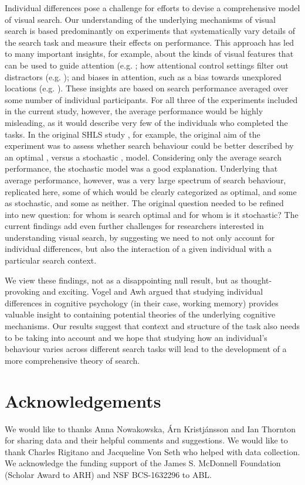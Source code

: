 \documentclass[twocolumn]{article}
\begin{document}
Individual differences pose a challenge for efforts to devise a comprehensive model of visual search. Our understanding of the underlying mechanisms of visual search is based predominantly on experiments that systematically vary details of the search task and measure their effects on performance. This approach has led to many important insights, for example, about the kinds of visual features that can be used to guide attention (e.g. \cite{treisman1980, wolfe2007}; how attentional control settings filter out distractors (e.g. \cite{folk1992,yantis1999}); and  biases in attention, such as a bias towards unexplored locations (e.g. \cite{klein2000}). These insights are based on search performance averaged over some number of individual participants. For all three of the experiments included in the current study, however, the average performance would be highly misleading, as it would describe very few of the individuals who completed the tasks. In the original SHLS study \cite{nowakowska2017}, for example, the original aim of the experiment was to assess whether search behaviour could be better described by an optimal \cite{najemnik-geisler2008}, versus a stochastic \cite{clarke2016}, model. Considering only the average search performance, the stochastic model was a good explanation. Underlying that average performance, however, was a very large spectrum of search behaviour, replicated here, some of which would be clearly categorized as optimal, and some as stochastic, and some as neither. The original question needed to be refined into new question: for whom is search optimal and for whom is it stochastic? The current findings add even further challenges for researchers interested in understanding visual search, by suggesting we need to not only account for individual differences, but also the interaction of a given individual with a particular search context. 

We view these findings, not as a disappointing null result, but as thought-provoking and exciting. Vogel and Awh\cite{vogel2008} argued that studying individual differences in cognitive psychology (in their case, working memory) provides valuable insight to containing potential theories of the underlying cognitive mechanisms. Our results suggest that context and structure of the task also needs to be taking into account and we hope that studying how an individual's behaviour varies across different search tasks will lead to the development of a more comprehensive theory of search. 


\section*{Acknowledgements}

We would like to thanks Anna Nowakowska, {\'A}rn Kristj{\'a}nsson and Ian Thornton for sharing data and their helpful comments and suggestions. We would like to thank Charles Rigitano and Jacqueline Von Seth who helped with data collection. We acknowledge the funding support of the James S. McDonnell Foundation (Scholar Award to ARH) and NSF BCS-1632296 to ABL.




\end{document}
